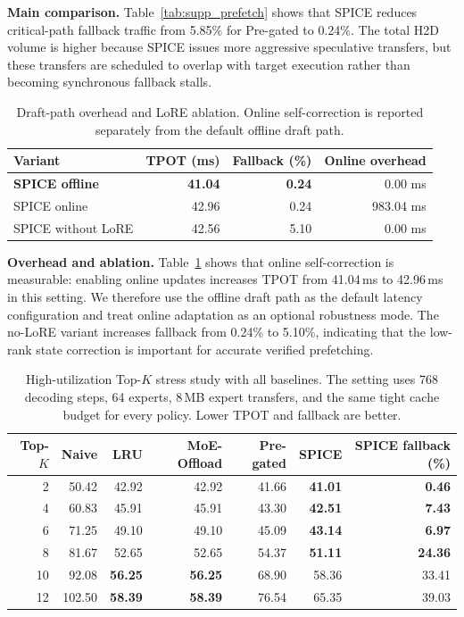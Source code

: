 \textbf{Main comparison.}
Table~\ref{tab:supp_prefetch} shows that SPICE reduces critical-path fallback
traffic from 5.85\% for Pre-gated to 0.24\%. The total H2D volume is higher
because SPICE issues more aggressive speculative transfers, but these transfers
are scheduled to overlap with target execution rather than becoming synchronous
fallback stalls.

\begin{table}[t]
\centering
\caption{Draft-path overhead and LoRE ablation. Online self-correction is
reported separately from the default offline draft path.}
\label{tab:supp_overhead}
\scriptsize
\begin{tabular}{lrrr}
\toprule
Variant & TPOT (ms) & Fallback (\%) & Online overhead \\
\midrule
\textbf{SPICE offline} & \textbf{41.04} & \textbf{0.24} & 0.00 ms \\
SPICE online & 42.96 & 0.24 & 983.04 ms \\
SPICE without LoRE & 42.56 & 5.10 & 0.00 ms \\
\bottomrule
\end{tabular}
\end{table}

\textbf{Overhead and ablation.}
Table~\ref{tab:supp_overhead} shows that online self-correction is measurable:
enabling online updates increases TPOT from 41.04\,ms to 42.96\,ms in this
setting. We therefore use the offline draft path as the default latency
configuration and treat online adaptation as an optional robustness mode. The
no-LoRE variant increases fallback from 0.24\% to 5.10\%, indicating that the
low-rank state correction is important for accurate verified prefetching.

\begin{table}[t]
\centering
\caption{High-utilization Top-$K$ stress study with all baselines. The setting
uses 768 decoding steps, 64 experts, 8\,MB expert transfers, and the same tight
cache budget for every policy. Lower TPOT and fallback are better.}
\label{tab:supp_topk_baselines}
\scriptsize
\begin{tabular}{rrrrrrr}
\toprule
Top-$K$ & Naive & LRU & MoE-Offload & Pre-gated & SPICE & SPICE fallback (\%) \\
\midrule
2 & 50.42 & 42.92 & 42.92 & 41.66 & \textbf{41.01} & \textbf{0.46} \\
4 & 60.83 & 45.91 & 45.91 & 43.30 & \textbf{42.51} & \textbf{7.43} \\
6 & 71.25 & 49.10 & 49.10 & 45.09 & \textbf{43.14} & \textbf{6.97} \\
8 & 81.67 & 52.65 & 52.65 & 54.37 & \textbf{51.11} & \textbf{24.36} \\
10 & 92.08 & \textbf{56.25} & \textbf{56.25} & 68.90 & 58.36 & 33.41 \\
12 & 102.50 & \textbf{58.39} & \textbf{58.39} & 76.54 & 65.35 & 39.03 \\
\bottomrule
\end{tabular}
\end{table}


